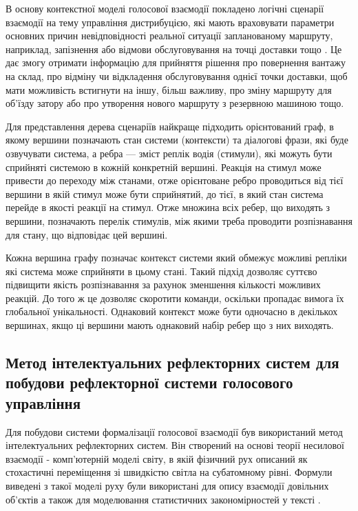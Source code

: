 В основу контекстної моделі голосової взаємодії покладено логічні сценарії взаємодії на тему управління дистрибуцією, які мають враховувати параметри основних причин невідповідності реальної ситуації запланованому маршруту, наприклад, запізнення або відмови обслуговування на точці доставки тощо \cite{art3}. Це дає змогу отримати інформацію для прийняття рішення про повернення вантажу на склад, про відміну чи відкладення обслуговування однієї точки доставки, щоб мати можливість встигнути на іншу, більш важливу, про зміну маршруту для об’їзду затору або про утворення нового маршруту з резервною машиною тощо.

Для представлення дерева сценаріїв найкраще підходить орієнтований граф, в якому вершини позначають стан системи (контексти) та діалогові фрази, які буде озвучувати система, а ребра — зміст реплік водія (стимули), які можуть бути сприйняті системою в кожній конкретній вершині. Реакція на стимул може привести до переходу між станами, отже орієнтоване ребро проводиться від тієї вершини в якій стимул може бути сприйнятий, до тієї, в який стан система перейде в якості реакції на стимул. Отже множина всіх ребер, що виходять з вершини, позначають перелік стимулів, між якими треба проводити розпізнавання для стану, що відповідає цей вершині.

Кожна вершина графу позначає контекст системи який обмежує можливі репліки які система може сприйняти в цьому стані. Такий підхід дозволяє суттєво підвищити якість розпізнавання за рахунок зменшення кількості можливих реакцій. До того ж це дозволяє скоротити команди, оскільки пропадає вимога їх глобальної унікальності. Однаковий контекст може бути одночасно в декількох вершинах, якщо ці вершини мають однаковий набір ребер що з них виходять.

\subsection{Метод інтелектуальних рефлекторних систем для побудови рефлекторної системи голосового управління}

Для побудови системи формалізації голосової взаємодії був використаний метод інтелектуальних рефлекторних систем. Він створений на основі теорії несилової взаємодії - комп'ютерній моделі світу, в якій фізичний рух описаний як стохастичні переміщення зі швидкістю світла на субатомному рівні. Формули виведені з такої моделі руху були використані для опису взаємодії довільних об'єктів а також для моделювання статистичних закономірностей у тексті \cite{Teslia_2010}.

